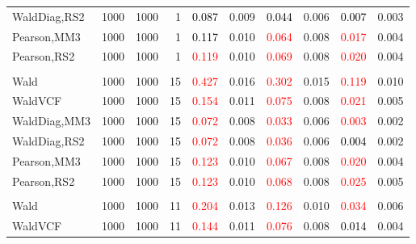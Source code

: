 \documentclass[
]{article}
\begin{document}
\begin{table}[H]
{\begin{tabular}[t]{lrrrrrrlrr}
\hspace{1em}WaldDiag,RS2 & 1000 & 1000 & 1 & \textcolor{black}{0.087} & 0.009 & \textcolor{black}{0.044} & 0.006 & \textcolor{black}{0.007} & 0.003\\
\hspace{1em}Pearson,MM3 & 1000 & 1000 & 1 & \textcolor{black}{0.117} & 0.010 & \textcolor{red}{0.064} & 0.008 & \textcolor{red}{0.017} & 0.004\\
\hspace{1em}Pearson,RS2 & 1000 & 1000 & 1 & \textcolor{red}{0.119} & 0.010 & \textcolor{red}{0.069} & 0.008 & \textcolor{red}{0.020} & 0.004\\
\addlinespace[0.3em]
\multicolumn{10}{l}{\textbf{1F 15V}}\\
\hspace{1em}Wald & 1000 & 1000 & 15 & \textcolor{red}{0.427} & 0.016 & \textcolor{red}{0.302} & 0.015 & \textcolor{red}{0.119} & 0.010\\
\hspace{1em}WaldVCF & 1000 & 1000 & 15 & \textcolor{red}{0.154} & 0.011 & \textcolor{red}{0.075} & 0.008 & \textcolor{red}{0.021} & 0.005\\
\hspace{1em}WaldDiag,MM3 & 1000 & 1000 & 15 & \textcolor{red}{0.072} & 0.008 & \textcolor{red}{0.033} & 0.006 & \textcolor{red}{0.003} & 0.002\\
\hspace{1em}WaldDiag,RS2 & 1000 & 1000 & 15 & \textcolor{red}{0.072} & 0.008 & \textcolor{red}{0.036} & 0.006 & \textcolor{black}{0.004} & 0.002\\
\hspace{1em}Pearson,MM3 & 1000 & 1000 & 15 & \textcolor{red}{0.123} & 0.010 & \textcolor{red}{0.067} & 0.008 & \textcolor{red}{0.020} & 0.004\\
\hspace{1em}Pearson,RS2 & 1000 & 1000 & 15 & \textcolor{red}{0.123} & 0.010 & \textcolor{red}{0.068} & 0.008 & \textcolor{red}{0.025} & 0.005\\
\addlinespace[0.3em]
\multicolumn{10}{l}{\textbf{2F 10V}}\\
\hspace{1em}Wald & 1000 & 1000 & 11 & \textcolor{red}{0.204} & 0.013 & \textcolor{red}{0.126} & 0.010 & \textcolor{red}{0.034} & 0.006\\
\hspace{1em}WaldVCF & 1000 & 1000 & 11 & \textcolor{red}{0.144} & 0.011 & \textcolor{red}{0.076} & 0.008 & \textcolor{black}{0.014} & 0.004\\

\end{tabular}}
\end{table}
\end{document}
